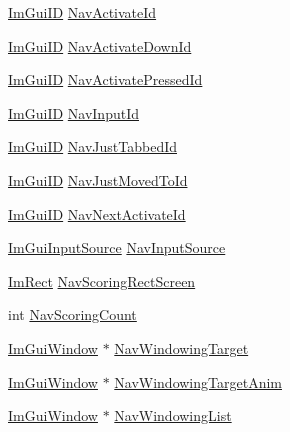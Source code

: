 \begin{DoxyCompactItemize}
\item 
\mbox{\hyperlink{imgui_8h_a1785c9b6f4e16406764a85f32582236f}{Im\+Gui\+ID}} \mbox{\hyperlink{struct_im_gui_context_a809b5fc440a6198e4266b36150dc3396}{Nav\+Activate\+Id}}
\item 
\mbox{\hyperlink{imgui_8h_a1785c9b6f4e16406764a85f32582236f}{Im\+Gui\+ID}} \mbox{\hyperlink{struct_im_gui_context_a07e49e172b0aad8b1ff2ac3df71b788b}{Nav\+Activate\+Down\+Id}}
\item 
\mbox{\hyperlink{imgui_8h_a1785c9b6f4e16406764a85f32582236f}{Im\+Gui\+ID}} \mbox{\hyperlink{struct_im_gui_context_a24929a88fa69cfb49cfd41c8cb4225d0}{Nav\+Activate\+Pressed\+Id}}
\item 
\mbox{\hyperlink{imgui_8h_a1785c9b6f4e16406764a85f32582236f}{Im\+Gui\+ID}} \mbox{\hyperlink{struct_im_gui_context_a61db117ce7f7128f90be0ea560c004b2}{Nav\+Input\+Id}}
\item 
\mbox{\hyperlink{imgui_8h_a1785c9b6f4e16406764a85f32582236f}{Im\+Gui\+ID}} \mbox{\hyperlink{struct_im_gui_context_afe76d25a666183763466ab19cd7d4816}{Nav\+Just\+Tabbed\+Id}}
\item 
\mbox{\hyperlink{imgui_8h_a1785c9b6f4e16406764a85f32582236f}{Im\+Gui\+ID}} \mbox{\hyperlink{struct_im_gui_context_a1ad32892bff3773daf74bf39f525e2c0}{Nav\+Just\+Moved\+To\+Id}}
\item 
\mbox{\hyperlink{imgui_8h_a1785c9b6f4e16406764a85f32582236f}{Im\+Gui\+ID}} \mbox{\hyperlink{struct_im_gui_context_abc1fa0d9750d44d4595905a0ce178ded}{Nav\+Next\+Activate\+Id}}
\item 
\mbox{\hyperlink{imgui__internal_8h_a8ee603a145a3a4f4ab5c93c8c8333b78}{Im\+Gui\+Input\+Source}} \mbox{\hyperlink{struct_im_gui_context_a3054bc5ed01af6c56159cd8de77e7b44}{Nav\+Input\+Source}}
\item 
\mbox{\hyperlink{struct_im_rect}{Im\+Rect}} \mbox{\hyperlink{struct_im_gui_context_a066c51092023d97383ff348fed5e2a21}{Nav\+Scoring\+Rect\+Screen}}
\item 
int \mbox{\hyperlink{struct_im_gui_context_a2ff237a66a4d995620cc03f309268e53}{Nav\+Scoring\+Count}}
\item 
\mbox{\hyperlink{struct_im_gui_window}{Im\+Gui\+Window}} $\ast$ \mbox{\hyperlink{struct_im_gui_context_a90cb834d237027d39e0d2efbe3d90d04}{Nav\+Windowing\+Target}}
\item 
\mbox{\hyperlink{struct_im_gui_window}{Im\+Gui\+Window}} $\ast$ \mbox{\hyperlink{struct_im_gui_context_aaaf83b57ad918ef20a653bc8f5dbcde7}{Nav\+Windowing\+Target\+Anim}}
\item 
\mbox{\hyperlink{struct_im_gui_window}{Im\+Gui\+Window}} $\ast$ \mbox{\hyperlink{struct_im_gui_context_afec14eb3bd7e3a7881fd8def6591cdfe}{Nav\+Windowing\+List}}

\end{DoxyCompactItemize}
